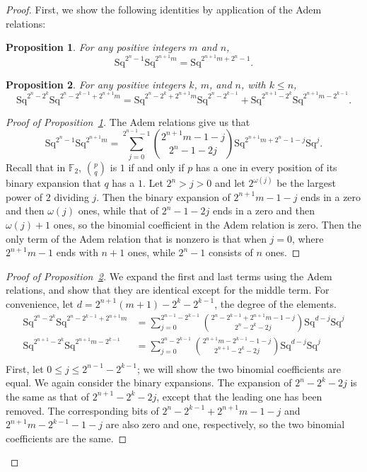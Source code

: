 \documentclass{article}
\newcommand{\F}{\mathbb{F}}
\newcommand{\Sq}{\mathrm{Sq}}
\newtheorem{prop}{Proposition}
\begin{document}
  \begin{proof}
    First, we show the following identities by application of the Adem relations:
    \begin{prop}\label{prop:identity-1}
      For any positive integers $m$ and $n$,
      \[\Sq^{2^n-1}\Sq^{2^{n+1}m}=\Sq^{2^{n+1}m+2^n-1}.\]
    \end{prop}
    \begin{prop}\label{prop:identity-2}
      For any positive integers $k$, $m$, and $n$, with $k\leq n$,
      \[\Sq^{2^n-2^k}\Sq^{2^n-2^{k-1}+2^{n+1}m}=\Sq^{2^n-2^k+2^{n+1}m}\Sq^{2^n-2^{k-1}}+\Sq^{2^{n+1}-2^k}\Sq^{2^{n+1}m-2^{k-1}}.\]
    \end{prop}
    \begin{proof}[Proof of Proposition~\ref{prop:identity-1}]
      The Adem relations give us that
      \[\Sq^{2^n-1}\Sq^{2^{n+1}m} = \sum_{j=0}^{2^{n-1}-1}\binom{2^{n+1}m-1-j}{2^n-1-2j}\Sq^{2^{n+1}m+2^n-1-j}\Sq^j.\]
      Recall that in $\F_2$, $\binom{p}{q}$ is $1$ if and only if $p$ has a one in every position of its binary expansion that $q$ has a $1$.  Let $2^n>j>0$ and let $2^{\omega(j)}$ be the largest power of $2$ dividing $j$.  Then the binary expansion of $2^{n+1}m-1-j$ ends in a zero and then $\omega(j)$ ones, while that of $2^n-1-2j$ ends in a zero and then $\omega(j)+1$ ones, so the binomial coefficient in the Adem relation is zero.  Then the only term of the Adem relation that is nonzero is that when $j=0$, where $2^{n+1}m-1$ ends with $n+1$ ones, while $2^n-1$ consists of $n$ ones.
    \end{proof}
    \begin{proof}[Proof of Proposition~\ref{prop:identity-2}]
      We expand the first and last terms using the Adem relations, and show that they are identical except for the middle term. For convenience, let $d=2^{n+1}(m+1)-2^k-2^{k-1}$, the degree of the elements.
      \begin{align*}
        \Sq^{2^n-2^k}\Sq^{2^n-2^{k-1}+2^{n+1}m} &= \sum_{j=0}^{2^{n-1}-2^{k-1}} \binom{2^n-2^{k-1}+2^{n+1}m-1-j}{2^n-2^k-2j} \Sq^{d-j}\Sq^j \\
        \Sq^{2^{n+1}-2^k}\Sq^{2^{n+1}m-2^{k-1}} &=\sum_{j=0}^{2^n-2^{k-1}}\binom{2^{n+1}m-2^{k-1}-1-j}{2^{n+1}-2^k-2j}\Sq^{d-j}\Sq^j \\
      \end{align*}
      First, let $0\leq j\leq 2^{n-1}-2^{k-1}$; we will show the two binomial coefficients are equal.  We again consider the binary expansions.  The expansion of $2^n-2^k-2j$ is the same as that of $2^{n+1}-2^k-2j$, except that the leading one has been removed.  The corresponding bits of $2^n-2^{k-1}+2^{n+1}m-1-j$ and $2^{n+1}m-2^{k-1}-1-j$ are also zero and one, respectively, so the two binomial coefficients are the same.


\end{proof}
\end{proof}
\end{document}
